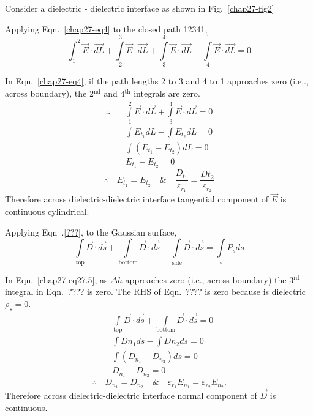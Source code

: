 Consider a dielectric - dielectric interface as shown in Fig.~\ref{chap27-fig2}

Applying Eqn.~\eqref{chap27-eq4} to the closed path 12341,
\begin{equation}
\int_{1}^{2} \overrightarrow{E} \cdot \overrightarrow{dL} + \int\limits_{2}^{3} \overrightarrow{E} \cdot \overrightarrow{dL} + \int\limits_{3}^{4} \overrightarrow{E} \cdot \overrightarrow{dL} + \int\limits_{4}^{1} \overrightarrow{E} \cdot \overrightarrow{dL} = 0\label{chap27-eq4}
\end{equation}

In Eqn.~\eqref{chap27-eq4}, if the path lengths 2 to 3 and 4 to 1 approaches zero (i.e.., across boundary), the 2$^{\text{nd}}$ and 4$^{\text{th}}$ integrals are zero. 
\begin{align*}
\therefore\quad  &\int\limits_{1}^{2} \overrightarrow{E} \cdot \overrightarrow{dL} + \int\limits_{3}^{4} \overrightarrow{E} \cdot \overrightarrow{dL} = 0\\
 & \int E_{t_{1}}dL - \int E_{t_{2}}dL  = 0\\
 & \int \left(E_{t_{1}} - E_{t_{2}}\right)dL  = 0\\
 & E_{t_{1}} - E_{t_{2}} = 0
\end{align*} 
$$
\therefore\quad E_{t_{1}} = E_{t_{2}} \quad\text{\&}\quad \dfrac{D_{t_{1}}}{\varepsilon_{r_{1}}} = \dfrac{Dt_{2}}{\varepsilon_{r_{2}}}
$$
Therefore across dielectric-dielectric interface 
tangential component of $\overrightarrow{E}$ is continuous cylindrical. 

Applying Eqn~.\eqref{???}, to the Gaussian surface, 
\begin{equation}
\int\limits_{\text{top}} \overrightarrow{D} \cdot \overrightarrow{ds} + \int\limits_{\text{bottom}} \overrightarrow{D} \cdot \overrightarrow{ds} + \int\limits_{\text{side}} \overrightarrow{D} \cdot \overrightarrow{ds} = \int\limits_{s} P_{s}ds\label{chap27-eq27.5}
\end{equation}

In Eqn.~\eqref{chap27-eq27.5}, as $\Delta h$ approaches zero (i.e., across boundary) the 3$^{\text{rd}}$ integral in Eqn.~???? is zero. The RHS of Eqn.~???? is zero because is dielectric $\rho_{s} = 0$.
\begin{align*}
& \int\limits_{\text{top}} \overrightarrow{D} \cdot \overrightarrow{ds} + \int\limits_{\text{bottom}} \overrightarrow{D} \cdot \overrightarrow{ds} = 0\\
& \int Dn_{1}ds - \int Dn_{2}ds  = 0\\
& \int (D_{n_{1}} - D_{n_{2}})ds = 0\\
& D_{n_{1}} - D_{n_{2}}  = 0
\end{align*}
$$
\therefore\quad  D_{n_{1}} = D_{n_{2}}  \quad\text{\&}\quad \varepsilon_{r_{1}}E_{n_{1}} = \varepsilon_{r_{2}}E_{n_{2}}. 
$$
Therefore across dielectric-dielectric interface normal component of $\overrightarrow{D}$ is continuous. 

